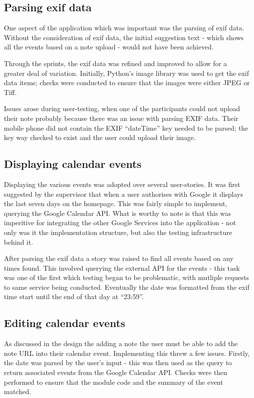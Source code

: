 {{{{{{\subsection{Parsing exif data}
One aspect of the application which was important was the parsing of exif data. Without the consideration of exif data, the initial suggestion text - which shows all the events based on a note upload - would not have been achieved.

Through the sprints, the exif data was refined and improved to allow for a greater deal of variation. Initially, Python's image library was used to get the exif data items; checks were conducted to ensure that the images were either JPEG or Tiff.

Issues arose during user-testing, when one of the participants could not upload their note probably because there was an issue with parsing EXIF data. Their mobile phone did not contain the EXIF ``dateTime'' key needed to be parsed; the key way checked to exist and the user could upload their image.

\subsection{Displaying calendar events}
Displaying the various events was adopted over several user-stories. It was first suggested by the supervisor that when a user authorises with Google it displays the last seven days on the homepage. This was fairly simple to implement, querying the Google Calendar API. What is worthy to note is that this was imperitive for integrating the other Google Services into the application - not only was it the implementation structure, but also the testing infrastructure behind it.

After parsing the exif data a story was raised to find all events based on any times found. This involved querying the external API for the events - this task was one of the first which testing began to be problematic, with mutliple requests to same service being conducted. Eventually the date was formatted from the exif time start until the end of that day at ``23:59''.

\subsection{Editing calendar events}
As discussed in the design the adding a note the user must be able to add the note URL into their calendar event. Implementing this threw a few issues. Firstly, the date was parsed by the user's input - this was then used as the query to return associated events from the Google Calendar API. Checks were then performed to ensure that the module code and the summary of the event matched.

}}}}}}
